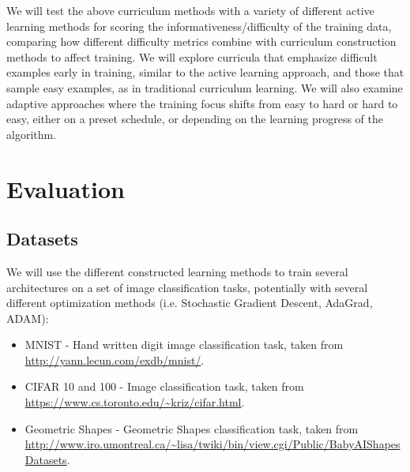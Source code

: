 \documentclass[a4paper,11pt]{article}
\begin{document}
We will test the above curriculum methods with a variety of different active learning methods for scoring the informativeness/difficulty of the training data, comparing how different difficulty metrics combine with curriculum construction methods to affect training. We will explore curricula that emphasize difficult examples early in training, similar to the active learning approach, and those that sample easy examples, as in traditional curriculum learning. We will also examine adaptive approaches where the training focus shifts from easy to hard or hard to easy, either on a preset schedule, or depending on the learning progress of the algorithm. 

\section{Evaluation}
\subsection*{Datasets}
We will use the different constructed learning methods to train several architectures on a set of image classification tasks, potentially with several different optimization methods (i.e. Stochastic Gradient Descent, AdaGrad, ADAM):
\begin{itemize}
	\item MNIST - Hand written digit image classification task, taken from \url{http://yann.lecun.com/exdb/mnist/}.
	\item CIFAR 10 and 100 -  Image classification task, taken from \url{https://www.cs.toronto.edu/~kriz/cifar.html}. 
	\item Geometric Shapes - Geometric Shapes classification task, taken from \url{http://www.iro.umontreal.ca/~lisa/twiki/bin/view.cgi/Public/BabyAIShapesDatasets}. 
\end{itemize}
\end{document}
